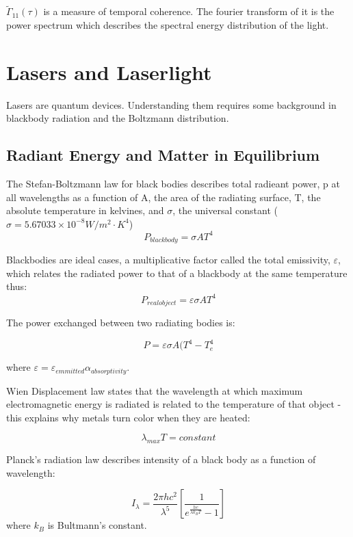 \documentclass[12pt]{report}
\begin{document}
$\tilde{\Gamma}_{11}(\tau)$ is a measure of temporal coherence. The fourier transform of it is the power spectrum which describes the spectral energy distribution of the light. 

\section{Lasers and Laserlight}
Lasers are quantum devices. Understanding them requires some background in blackbody radiation and the Boltzmann distribution. 

\subsection{Radiant Energy and Matter in Equilibrium}
The Stefan-Boltzmann law for black bodies describes total radieant power, p at all wavelengths as a function of A, the area of the radiating surface, T, the absolute temperature in kelvines, and $\sigma$, the universal constant ($\sigma = 5.67033 \times 10^{-8} W/m^2 \cdot K^4$)
\begin{equation}
P_{black body} = \sigma A T^4
\end{equation}

Blackbodies are ideal cases, a multiplicative factor called the total emissivity, $\varepsilon$, which relates the radiated power to that of a blackbody at the same temperature thus:
\begin{equation}
P_{real object} = \varepsilon \sigma A T^4
\end{equation}

The power exchanged between two radiating bodies is: 

\[P = \varepsilon \sigma A (T^4 - T_e^4\]

where $\varepsilon = \varepsilon_{emmitted} \alpha_{absorptivity}$.


Wien Displacement law states that the wavelength at which maximum electromagnetic energy is radiated is related to the temperature of that object - this explains why metals turn color when they are heated:

\begin{equation}
\lambda_{max} T = constant
\end{equation}

Planck's radiation law describes  intensity of a black body as a function of wavelength:

\begin{equation}
I_\lambda = \frac{2 \pi h c^2}{\lambda^5} \left[ \frac{1}{e^{\frac{hc}{\lambda k_B T}} -1} \right]
\end{equation}
where $k_B$ is Bultmann's constant. 
\end{document}
